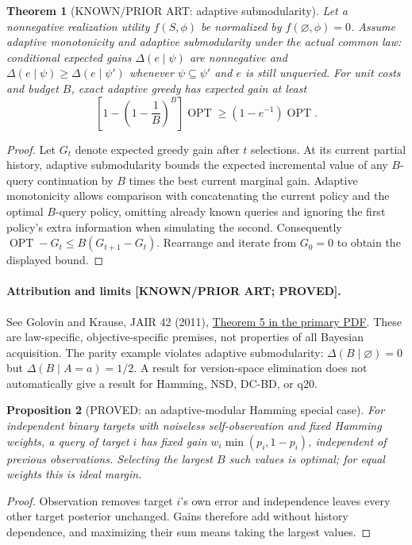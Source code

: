\documentclass[11pt]{article}
\newtheorem{theorem}{Theorem}[section]
\newtheorem{proposition}[theorem]{Proposition}
\theoremstyle{definition}
\theoremstyle{remark}
\begin{document}
\begin{theorem}[KNOWN/PRIOR ART: adaptive submodularity]
Let a nonnegative realization utility $f(S,\phi)$ be normalized by
$f(\varnothing,\phi)=0$.  Assume adaptive monotonicity and adaptive
submodularity under the actual common law: conditional expected gains
$\Delta(e\mid\psi)$ are nonnegative and
$\Delta(e\mid\psi)\geq\Delta(e\mid\psi')$ whenever $\psi\subseteq\psi'$
and $e$ is still unqueried.  For unit costs and budget $B$, exact adaptive
greedy has expected gain at least
\[
 \left[1-\left(1-\frac1B\right)^B\right]\operatorname{OPT}
 \geq(1-e^{-1})\operatorname{OPT}.
\]
\end{theorem}
\begin{proof}
Let $G_t$ denote expected greedy gain after $t$ selections.  At its current
partial history, adaptive submodularity bounds the expected incremental
value of any $B$-query continuation by $B$ times the best current marginal
gain.  Adaptive monotonicity allows comparison with concatenating the
current policy and the optimal $B$-query policy, omitting already known
queries and ignoring the first policy's extra information when simulating
the second.  Consequently
$\operatorname{OPT}-G_t\leq B(G_{t+1}-G_t)$.
Rearrange and iterate from $G_0=0$ to obtain the displayed bound.
\end{proof}

\paragraph{Attribution and limits [KNOWN/PRIOR ART; PROVED].}
See Golovin and Krause, JAIR 42 (2011),
\href{https://arxiv.org/pdf/1003.3967}{Theorem 5 in the primary PDF}.
These are law-specific, objective-specific premises, not properties of
all Bayesian acquisition.  The parity example violates adaptive
submodularity: $\Delta(B\mid\varnothing)=0$ but
$\Delta(B\mid A=a)=1/2$.  A result for version-space elimination does not
automatically give a result for Hamming, NSD, DC-BD, or q20.

\begin{proposition}[PROVED: an adaptive-modular Hamming special case]
For independent binary targets with noiseless self-observation and fixed
Hamming weights, a query of target $i$ has fixed gain
$w_i\min(p_i,1-p_i)$, independent of previous observations.  Selecting the
largest $B$ such values is optimal; for equal weights this is ideal margin.
\end{proposition}
\begin{proof}
Observation removes target $i$'s own error and independence leaves every
other target posterior unchanged.  Gains therefore add without history
dependence, and maximizing their sum means taking the largest values.
\end{proof}
\end{document}
